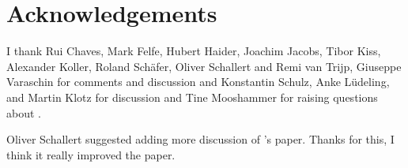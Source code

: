 \section*{Acknowledgements}

I thank Rui Chaves, Mark Felfe, Hubert Haider, Joachim Jacobs, Tibor Kiss, Alexander Koller, Roland
Schäfer, Oliver Schallert and Remi van Trijp, Giuseppe
Varaschin for comments and discussion and Konstantin Schulz, Anke Lüdeling, and Martin Klotz for 
discussion and Tine Mooshammer for raising questions about .

Oliver Schallert suggested adding more discussion of \citeauthor{Piantadosi2024a}'s paper. Thanks
for this, I think it really improved the paper.



